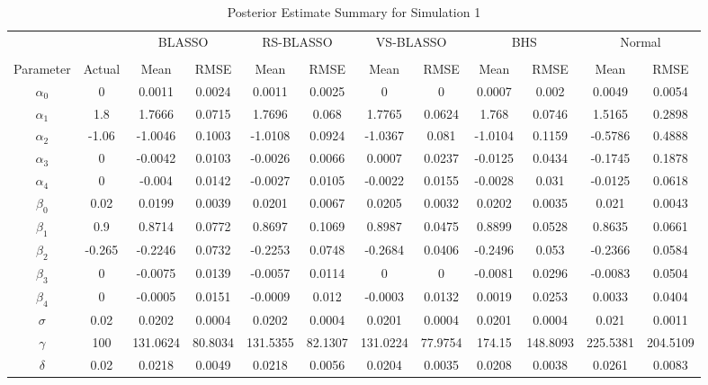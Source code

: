 \begin{table}
	\small
  \centering
  \caption{Posterior Estimate Summary for Simulation 1}
    \begin{tabular}{cccccccccccc}
    \toprule
   & & \multicolumn{2}{c}{BLASSO} &\multicolumn{2}{c}{RS-BLASSO} &\multicolumn{2}{c}{VS-BLASSO}  & \multicolumn{2}{c}{BHS} & \multicolumn{2}{c}{Normal} \\
    \cline{3-4} \cline{5-6} \cline{7-8} \cline{9-10} \cline{11-12}\\
    Parameter & Actual & Mean  & RMSE &  Mean & RMSE & Mean & RMSE & Mean & RMSE & Mean & RMSE   \\
    \midrule
   $\alpha_0$ & 0    & 0.0011 & 0.0024 & 0.0011 & 0.0025 & 0    & 0    & 0.0007 & 0.002 & 0.0049 & 0.0054 \\
    $\alpha_1$ & 1.8  & 1.7666 & 0.0715 & 1.7696 & 0.068 & 1.7765 & 0.0624 & 1.768 & 0.0746 & 1.5165 & 0.2898 \\
    $\alpha_2$ & -1.06 & -1.0046 & 0.1003 & -1.0108 & 0.0924 & -1.0367 & 0.081 & -1.0104 & 0.1159 & -0.5786 & 0.4888 \\
    $\alpha_3$ & 0    & -0.0042 & 0.0103 & -0.0026 & 0.0066 & 0.0007 & 0.0237 & -0.0125 & 0.0434 & -0.1745 & 0.1878 \\
    $\alpha_4$ & 0    & -0.004 & 0.0142 & -0.0027 & 0.0105 & -0.0022 & 0.0155 & -0.0028 & 0.031 & -0.0125 & 0.0618 \\
    $\beta_0$ & 0.02 & 0.0199 & 0.0039 & 0.0201 & 0.0067 & 0.0205 & 0.0032 & 0.0202 & 0.0035 & 0.021 & 0.0043 \\
    $\beta_1$ & 0.9  & 0.8714 & 0.0772 & 0.8697 & 0.1069 & 0.8987 & 0.0475 & 0.8899 & 0.0528 & 0.8635 & 0.0661 \\
    $\beta_2$ & -0.265 & -0.2246 & 0.0732 & -0.2253 & 0.0748 & -0.2684 & 0.0406 & -0.2496 & 0.053 & -0.2366 & 0.0584 \\
    $\beta_3$ & 0    & -0.0075 & 0.0139 & -0.0057 & 0.0114 & 0    & 0    & -0.0081 & 0.0296 & -0.0083 & 0.0504 \\
    $\beta_4$ & 0    & -0.0005 & 0.0151 & -0.0009 & 0.012 & -0.0003 & 0.0132 & 0.0019 & 0.0253 & 0.0033 & 0.0404 \\
    $\sigma$ & 0.02 & 0.0202 & 0.0004 & 0.0202 & 0.0004 & 0.0201 & 0.0004 & 0.0201 & 0.0004 & 0.021 & 0.0011 \\
    $\gamma$ & 100  & 131.0624 & 80.8034 & 131.5355 & 82.1307 & 131.0224 & 77.9754 & 174.15 & 148.8093 & 225.5381 & 204.5109 \\
    $\delta$ & 0.02 & 0.0218 & 0.0049 & 0.0218 & 0.0056 & 0.0204 & 0.0035 & 0.0208 & 0.0038 & 0.0261 & 0.0083 \\
    \bottomrule
    \end{tabular}%
  \label{tab:blassobhssummary}%
\end{table}%

